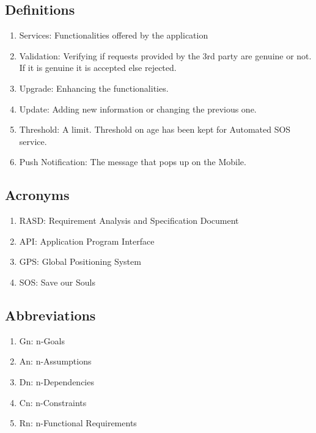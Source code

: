 \subsection{Definitions}
\begin{enumerate}
\item Services: Functionalities offered by the application
\item Validation: Verifying if requests provided by the 3rd party are genuine or not. If it is genuine it is accepted else rejected.
\item Upgrade: Enhancing the functionalities. 
\item Update: Adding new information or changing the previous one.
\item Threshold: A limit. Threshold on age has been kept for Automated SOS service.
\item Push Notification: The message that pops up on the Mobile. 
\end{enumerate}

\subsection{Acronyms}
\begin{enumerate}
\item RASD: Requirement Analysis and Specification Document
\item API: Application Program Interface
\item GPS: Global Positioning System
\item SOS: Save our Souls
\end{enumerate}

\subsection{Abbreviations}
\begin{enumerate}
\item Gn: n-Goals
\item An: n-Assumptions
\item Dn: n-Dependencies
\item Cn: n-Constraints
\item Rn: n-Functional Requirements
\end{enumerate}
